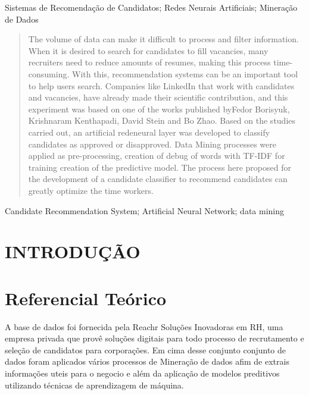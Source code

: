 \documentclass[conference]{IEEEtran}
\begin{document}
\begin{IEEEkeywords}
Sistemas de Recomendação de Candidatos; Redes Neurais Artificiais; Mineração de Dados
\end{IEEEkeywords}
\begin{abstract}
The volume of data can make it difficult to process and filter information. When it is desired to search for candidates to fill vacancies, many recruiters need to reduce amounts of resumes, making this process time-consuming. With this, recommendation systems can be an important tool to help users search. Companies like LinkedIn that work with candidates and vacancies, have already made their scientific contribution, and this experiment was based on one of the works published byFedor Borisyuk, Krishnaram Kenthapadi, David Stein and Bo Zhao. Based on the studies carried out, an artificial redeneural layer was developed to classify candidates as approved or disapproved. Data Mining processes were applied as pre-processing, creation of debug of words with TF-IDF for training creation of the predictive model. The process here proposed for the development of a candidate classifier to recommend candidates can greatly optimize the time workers.

\end{abstract}
\begin{IEEEkeywords}

Candidate Recommendation System; Artificial Neural Network; data mining
\end{IEEEkeywords}

\section{INTRODUÇÃO}

    

\section{Referencial Teórico}
	
    A base de dados foi fornecida pela Reachr Soluções Inovadoras em RH, uma empresa privada que provê soluções digitais para todo processo de recrutamento e seleção de candidatos para corporações. Em cima desse conjunto conjunto de dados foram aplicados vários processos de Mineração de dados afim de extrais informações uteis para o negocio e além da aplicação de modelos preditivos utilizando técnicas de aprendizagem de máquina.
    	
\end{document}
